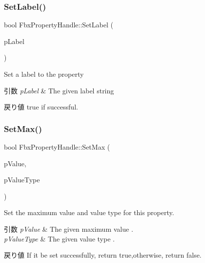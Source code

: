 \subsubsection{\texorpdfstring{Set\+Label()}{SetLabel()}}
{\footnotesize\ttfamily bool Fbx\+Property\+Handle\+::\+Set\+Label (\begin{DoxyParamCaption}\item[{const char $\ast$}]{p\+Label }\end{DoxyParamCaption})}

Set a label to the property 
\begin{DoxyParams}{引数}
{\em p\+Label} & The given label string \\
\hline
\end{DoxyParams}
\begin{DoxyReturn}{戻り値}
{\ttfamily true} if successful. 
\end{DoxyReturn}
\mbox{\label{class_fbx_property_handle_a5e41a6d59cd7a1b1c0325b7cf4476285}} 
\subsubsection{\texorpdfstring{Set\+Max()}{SetMax()}\hspace{0.1cm}{\footnotesize\ttfamily [1/2]}}
{\footnotesize\ttfamily bool Fbx\+Property\+Handle\+::\+Set\+Max (\begin{DoxyParamCaption}\item[{const void $\ast$}]{p\+Value,  }\item[{\hyperlink{fbxpropertytypes_8h_a73913a5ddfb20e57c6f25e9e6784bd92}{E\+Fbx\+Type}}]{p\+Value\+Type }\end{DoxyParamCaption})}

Set the maximum value and value type for this property. 
\begin{DoxyParams}{引数}
{\em p\+Value} & The given maximum value . \\
\hline
{\em p\+Value\+Type} & The given value type . \\
\hline
\end{DoxyParams}
\begin{DoxyReturn}{戻り値}
If it be set successfully, return true,otherwise, return false. 
\end{DoxyReturn}
\mbox{\label{class_fbx_property_handle_abda2411b3b6fb98963c1009b3c2e1425}} 
